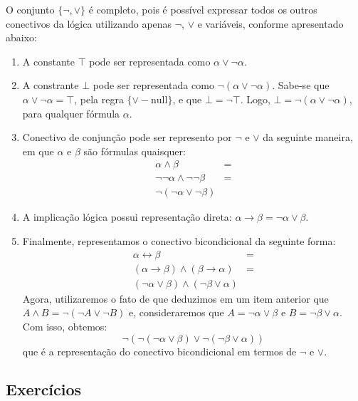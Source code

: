 \begin{Example}
O conjunto $\{\neg,\lor\}$ é completo, pois é possível expressar todos
os outros conectivos da lógica utilizando apenas $\neg$, $\lor$ e
variáveis, conforme apresentado abaixo:
\begin{enumerate}
     \item A constante $\top$ pode ser representada como $\alpha\lor\neg\alpha$.
     \item A constrante $\bot$ pode ser representada como $\neg (\alpha
       \lor \neg \alpha)$. Sabe-se que $\alpha \lor \neg \alpha= \top$, pela regra
       $\{\lor-\text{null}\}$, e que $\bot = \neg \top$. Logo, $\bot = \neg
       (\alpha \lor \neg \alpha)$, para qualquer fórmula $\alpha$.
     \item Conectivo de conjunção pode ser represento por $\neg$ e
       $\lor$ da seguinte maneira, em que $\alpha$ e $\beta$ são
       fórmulas quaisquer:
\[
\begin{array}{lc}
  \alpha \land \beta & = \\
\neg\neg \alpha \land \neg\neg \beta & = \\
\neg(\neg \alpha \lor \neg \beta)
\end{array}
\]
    \item A implicação lógica possui representação direta:
      $\alpha\to\beta = \neg\alpha\lor\beta$.
    \item Finalmente, representamos o conectivo bicondicional da
      seguinte forma:
\[
\begin{array}{lc}
    \alpha\leftrightarrow\beta & =\\
   (\alpha \to \beta)\land (\beta \to \alpha) & = \\
   (\neg \alpha \lor \beta) \land (\neg \beta\lor \alpha)
\end{array}
\]
    Agora, utilizaremos o fato de que deduzimos em um item anterior
    que  $A \land B = \neg (\neg A \lor \neg B)$ e, consideraremos que
   $A = \neg\alpha \lor \beta$ e $B = \neg \beta \lor \alpha$. Com
   isso, obtemos:
\[
\neg(\neg (\neg\alpha \lor \beta)\lor \neg (\neg \beta \lor \alpha))
\]
que é a representação do conectivo bicondicional em termos de $\neg$ e $\lor$.
\end{enumerate}
\end{Example}

\subsection{Exercícios}

